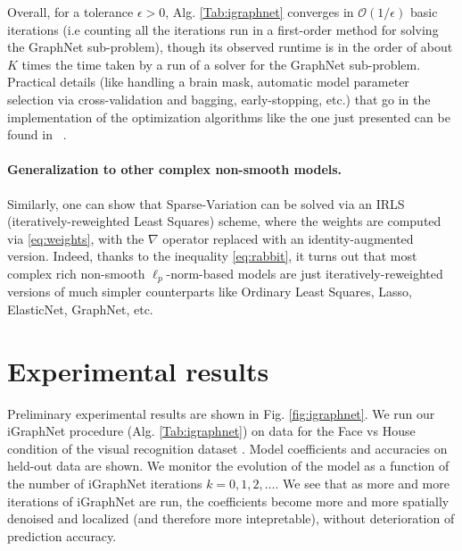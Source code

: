 Overall, for a
tolerance $\epsilon > 0$, Alg. \ref{Tab:igraphnet} converges
in $\mathcal O(1/\epsilon)$ basic
iterations (i.e counting all the iterations run in a first-order
method for solving the GraphNet sub-problem), though its observed
runtime is in the order of about $K$ times the time taken by a run of
a solver for the GraphNet sub-problem.
Practical details (like handling a brain mask, automatic model
parameter selection via cross-validation and bagging, early-stopping,
etc.) that go in the implementation of the optimization algorithms like the
one just presented can be found in
~\citep{dohmatob2014benchmarking}.

\paragraph*{Generalization to other complex non-smooth models.}
Similarly, one can show that Sparse-Variation
\citep{eickenberg2015total} can be solved via an IRLS
(iteratively-reweighted Least Squares) scheme, where the weights are
computed via \eqref{eq:weights}, with the $\nabla$ operator replaced
with an identity-augmented version. Indeed, thanks to the inequality
\eqref{eq:rabbit}, it turns out that most
complex rich non-smooth $\ell_p$-norm-based models are just
iteratively-reweighted versions of much simpler counterparts like
Ordinary Least Squares, Lasso, ElasticNet, GraphNet, etc.


\section{Experimental results}
Preliminary experimental results are shown in Fig. \ref{fig:igraphnet}.
We run our iGraphNet procedure (Alg. \ref{Tab:igraphnet})  on data for the Face vs House condition of the visual
recognition dataset \citep{haxby2001}.
Model coefficients and accuracies on held-out data are shown. We monitor the evolution of the model as a function of the number of iGraphNet iterations $k = 0, 1, 2,\ldots$.
We see that as more and more iterations of iGraphNet are run, the coefficients become more and more spatially denoised and localized (and therefore more
intepretable), without deterioration of prediction accuracy.

